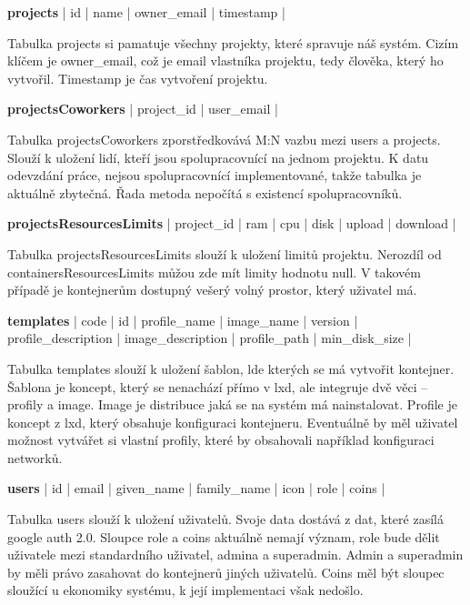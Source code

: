 \documentclass[a4paper,oneside,12pt]{report}
\begin{document}
\vspace{0.3cm}
\noindent
\textbf{projects} | id | name | owner\_email | timestamp |

Tabulka projects si pamatuje všechny projekty, které spravuje náš systém.
Cizím klíčem je owner\_email, což je email vlastníka projektu, tedy člověka, který ho vytvořil.
Timestamp je čas vytvoření projektu.

\vspace{0.3cm}
\noindent
\textbf{projectsCoworkers} | project\_id | user\_email |

Tabulka projectsCoworkers zporstředkovává M:N vazbu mezi users a projects.
Slouží k uložení lidí, kteří jsou spolupracovnící na jednom projektu.
K datu odevzdání práce, nejsou spolupracovnící implementované, takže tabulka je aktuálně zbytečná.
Řada metoda nepočítá s existencí spolupracovníků.

\vspace{0.3cm}
\noindent
\textbf{projectsResourcesLimits} | project\_id | ram | cpu | disk | upload | download |

Tabulka projectsResourcesLimits slouží k uložení limitů projektu.
Nerozdíl od containersResourcesLimits můžou zde mít limity hodnotu null.
V takovém případě je kontejnerům dostupný vešerý volný prostor, který uživatel má.

\vspace{0.3cm}
\noindent
\textbf{templates} | code | id | profile\_name | image\_name | version | profile\_description | image\_description | profile\_path | min\_disk\_size |

Tabulka templates slouží k uložení šablon, lde kterých se má vytvořit kontejner.
Šablona je koncept, který se nenachází přímo v lxd, ale integruje dvě věci -- profily a image.
Image je distribuce jaká se na systém má nainstalovat.
Profile je koncept z lxd, který obsahuje konfiguraci kontejneru.
Eventuálně by měl uživatel možnost vytvářet si vlastní profily, které by obsahovali například konfiguraci networků.

\vspace{0.3cm}
\noindent
\textbf{users} | id | email | given\_name | family\_name | icon | role | coins |

Tabulka users slouží k uložení uživatelů.
Svoje data dostává z dat, které zasílá google auth 2.0.
Sloupce role a coins aktuálně nemají význam, role bude dělit uživatele mezi standardního uživatel, admina a superadmin.
Admin a superadmin by měli právo zasahovat do kontejnerů jiných uživatelů.
Coins měl být sloupec sloužící u ekonomiky systému, k její implementaci však nedošlo.
\end{document}
